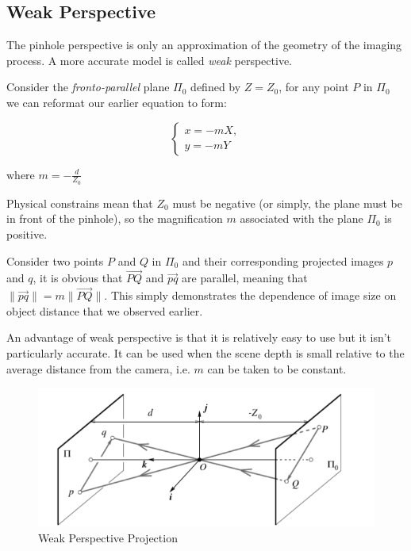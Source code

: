 \documentclass{article}
\begin{document}
\subsection{Weak Perspective}

The pinhole perspective is only an approximation of the geometry of the imaging process. A more accurate model is called \textit{weak} perspective.

Consider the \textit{fronto-parallel} plane $\Pi_{0}$ defined by $Z = Z_{0}$, for any point $P$ in $\Pi_{0}$ we can reformat our earlier equation to form:

\[
  \begin{cases}
    x = -mX, \\
    y = -mY
  \end{cases}
\]

 $ \text{where } m = - \frac{d}{Z_{0}}$

 Physical constrains mean that $Z_{0}$ must be negative (or simply, the plane must be in front of the pinhole), so the magnification $m$ associated with the plane $\Pi_{0}$ is positive.

Consider two points $P$ and $Q$ in $\Pi_{0}$ and their corresponding projected images $p$ and $q$, it is obvious that $\vec{PQ}$ and $\vec{pq}$ are parallel, meaning that $\|\vec{pq}\| = m \| \vec{PQ} \|$. This  simply demonstrates the dependence of image size on object distance that we observed earlier.

An advantage of weak perspective is that it is relatively easy to use but it isn't particularly accurate. It can be used when the scene depth is small relative to the average distance from the camera, i.e. $m$ can be taken to be constant.

\begin{figure}[ht]
  \centering
  \includegraphics[scale=0.6]{figures/weakperspective.png}
  \caption{\label{fig:weakperspective} Weak Perspective Projection}
\end{figure}
\end{document}
